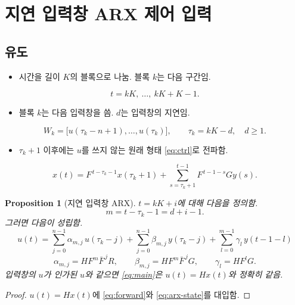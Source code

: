 \documentclass[11pt,a4paper]{article}
\newtheorem{proposition}{Proposition}
\newcommand{\Fb}{\bar F}
\begin{document}
\section{지연 입력창 ARX 제어 입력}\label{sec:window}

\subsection{유도}
\begin{itemize}
\item 시간을 길이 $K$의 블록으로 나눔. 블록 $k$는 다음 구간임.
\end{itemize}
\begin{equation}
t=kK,\ \dots,\ kK+K-1 .
\end{equation}
\begin{itemize}
\item 블록 $k$는 다음 입력창을 씀. $d$는 입력창의 지연임.
\end{itemize}
\begin{equation}
W_k=\bigl[u(\tau_k-n+1),\dots,u(\tau_k)\bigr],\qquad \tau_k=kK-d,\quad d\ge1 .
\end{equation}
\begin{itemize}
\item $\tau_k+1$ 이후에는 $u$를 쓰지 않는 원래 형태 \eqref{eq:ctrl}로 전파함.
\end{itemize}
\begin{equation}
x(t)=F^{\,t-\tau_k-1}x(\tau_k+1)+\sum_{s=\tau_k+1}^{t-1}F^{\,t-1-s}Gy(s).
\label{eq:forward}
\end{equation}

\begin{proposition}[지연 입력창 ARX]
$t=kK+i$에 대해 다음을 정의함.
\begin{equation}
m=t-\tau_k-1=d+i-1 .
\end{equation}
그러면 다음이 성립함.
\begin{equation}
\boxed{\;u(t)=\sum_{j=0}^{n-1}\alpha_{m,j}\,u(\tau_k-j)+\sum_{j=0}^{n-1}\beta_{m,j}\,y(\tau_k-j)+\sum_{l=0}^{m-1}\gamma_l\,y(t-1-l)\;}
\label{eq:main}
\end{equation}
\begin{equation}
\alpha_{m,j}=HF^m\Fb^{\,j}R,\qquad\beta_{m,j}=HF^m\Fb^{\,j}G,\qquad\gamma_l=HF^lG .
\label{eq:coef}
\end{equation}
입력창의 $u$가 인가된 $u$와 같으면 \eqref{eq:main}은 $u(t)=Hx(t)$와 정확히 같음.
\end{proposition}
\begin{proof}
$u(t)=Hx(t)$에 \eqref{eq:forward}와 \eqref{eq:arx-state}를 대입함.
\end{proof}
\end{document}
